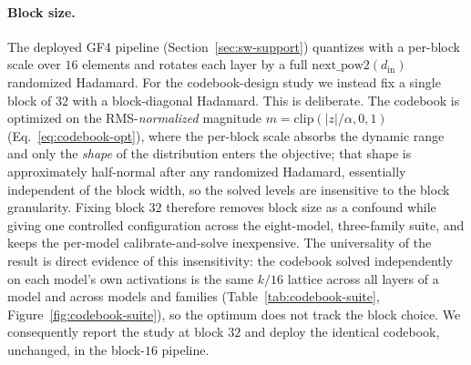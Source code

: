 \paragraph{Block size.} The deployed GF4 pipeline (Section~\ref{sec:sw-support})
quantizes with a per-block scale over $16$ elements and rotates each layer by a
full $\mathrm{next\_pow2}(d_{\mathrm{in}})$ randomized Hadamard. For the
codebook-design study we instead fix a single block of $32$ with a block-diagonal
Hadamard. This is deliberate. The codebook is optimized on the RMS-\emph{normalized}
magnitude $m=\mathrm{clip}(|z|/\alpha,0,1)$ (Eq.~\ref{eq:codebook-opt}), where the
per-block scale absorbs the dynamic range and only the \emph{shape} of the
distribution enters the objective; that shape is approximately half-normal after
any randomized Hadamard, essentially independent of the block width, so the solved
levels are insensitive to the block granularity. Fixing block $32$ therefore
removes block size as a confound while giving one controlled configuration across
the eight-model, three-family suite, and keeps the per-model calibrate-and-solve
inexpensive. The universality of the result is direct evidence of this
insensitivity: the codebook solved independently on each model's own activations
is the same $k/16$ lattice across all layers of a model and across models and
families (Table~\ref{tab:codebook-suite}, Figure~\ref{fig:codebook-suite}), so the
optimum does not track the block choice. We consequently report the study at
block $32$ and deploy the identical codebook, unchanged, in the block-$16$
pipeline.
